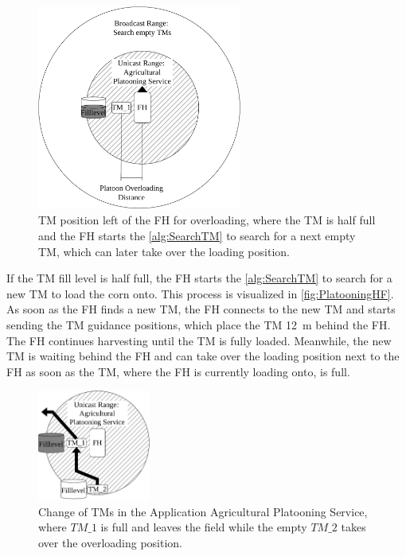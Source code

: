 \begin{figure}[]%
	\centering
	\includegraphics[width=0.6\textwidth]{figures/platoonHALF}
	\caption{\acf{TM} position left of the \acf{FH} for overloading, where the \ac{TM} is half full and the
		\ac{FH} starts the \autoref{alg:SearchTM} to search for a next empty \ac{TM},
		which can later take over the loading position.}
	\label{fig:PlatooningHF}%
\end{figure}
If the \ac{TM} fill level is half full, the \ac{FH} starts the \autoref{alg:SearchTM}
to search for a new \ac{TM} to load the corn onto.
This process is visualized in \autoref{fig:PlatooningHF}.
As soon as the \ac{FH} finds a new \ac{TM}, the \ac{FH} connects to the new \ac{TM} and starts sending
the \ac{TM} guidance positions, which place the \ac{TM} \SI{12}{\metre} behind the \ac{FH}.
The \ac{FH} continues harvesting until the \ac{TM} is fully loaded.
Meanwhile, the new \ac{TM} is waiting behind the \ac{FH} and can take over the loading position next to the \ac{FH} as
soon as the \ac{TM}, where the \ac{FH} is currently loading onto, is full.

\begin{figure}[]%
	\centering
	\includegraphics[width=0.33\textwidth]{figures/platoonFULL}
	\caption{Change of \acf{TM}s in the Application Agricultural Platooning Service, where $TM\_1$
	is full and leaves the field while the empty $TM\_2$ takes over the overloading position.}
	\label{fig:PlatooningFull}%
\end{figure}

